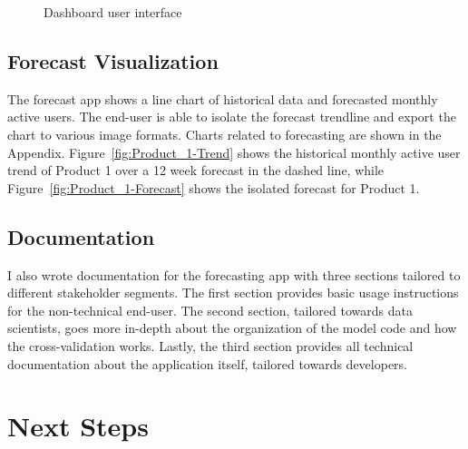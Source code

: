 \documentclass[11pt, oneside]{article}
\begin{document}
\begin{figure}[h]
  \caption{Dashboard user interface}
  \centering
  \label{fig:Dashboard}
\end{figure}

\subsection{Forecast Visualization}
The forecast app shows a line chart of historical data and forecasted monthly active users. The end-user is able to isolate the forecast trendline and export the chart to various image formats. Charts related to forecasting are shown in the Appendix. Figure~\ref{fig:Product_1-Trend} shows the historical monthly active user trend of Product 1 over a 12 week forecast in the dashed line, while Figure~\ref{fig:Product_1-Forecast} shows the isolated forecast for Product 1.

\subsection{Documentation}
I also wrote documentation for the forecasting app with three sections tailored to different stakeholder segments. The first section provides basic usage instructions for the non-technical end-user. The second section, tailored towards data scientists, goes more in-depth about the organization of the model code and how the cross-validation works. Lastly, the third section provides all technical documentation about the application itself, tailored towards developers.

\section{Next Steps}
\end{document}
